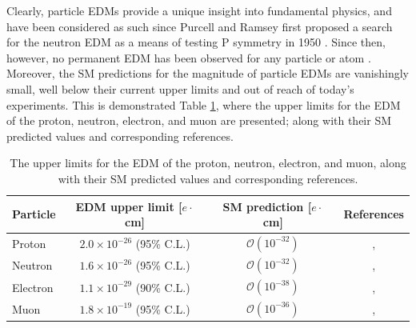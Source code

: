 Clearly, particle EDMs provide a unique insight into fundamental physics, and have been considered as such since Purcell and Ramsey first proposed a search for the neutron EDM as a means of testing P symmetry in 1950 \cite{PurcellAndRamsey}. Since then, however, no permanent EDM has been observed for any particle or atom \cite{ChuppEDMReview}. Moreover, the SM predictions for the magnitude of particle EDMs are vanishingly small, well below their current upper limits and out of reach of today's experiments. This is demonstrated Table \ref{tbl:ParticleEDMs}, where the upper limits for the EDM of the proton, neutron, electron, and muon are presented; along with their SM predicted values and corresponding references. 

\begin{table}[t!]
\centering
\begin{tabular}{l|ccc}
\hline
\hline
 Particle & EDM upper limit [$e\cdot$cm] & SM prediction [$e\cdot$cm] & References \\ 
\hline
 Proton & $2.0\times10^{-26}$ (95\% C.L.) & $\mathcal{O}(10^{-32})$ & \cite{199HgEDMLimits}, \cite{ProtonNeutronEDMPred}  \\ 
 Neutron & $1.6\times10^{-26}$ (95\% C.L.) & $\mathcal{O}(10^{-32})$ &  \cite{199HgEDMLimits}, \cite{ProtonNeutronEDMPred}  \\
Electron & $1.1\times10^{-29}$ (90\% C.L.) & $\mathcal{O}(10^{-38})$ & \cite{ImprovedElectronEDMLimit}, \cite{ElectronEDMPred} \\
 Muon & $1.8\times10^{-19}$ (95\% C.L.) & $\mathcal{O}(10^{-36})$ & \cite{BNLEDM}, \cite{ElectronEDMPred} \\
\hline
\hline
\end{tabular}
\caption{The upper limits for the EDM of the proton, neutron, electron, and muon, along with their SM predicted values and corresponding references.}
\label{tbl:ParticleEDMs}
\end{table}



